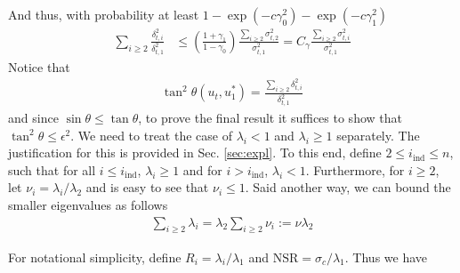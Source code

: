 \documentclass[10pt]{article}
\newcommand{\nsrmax}{\text{NSR}}
\newcommand{\ind}{\mathrm{ind}}
\begin{document}
And thus, with probability at least $ 1 - \exp(-c \gamma_0^2) - \exp(-c \gamma_1^2)$ %
\begin{align*}
\sum_{i \geq 2}\frac{\delta_{t,i}^2}{\delta_{t,1}^2} &\leq  \left(\frac{1 + \gamma_1}{1 - \gamma_0}\right) \frac{\sum_{i\geq 2} \sigma_{t,2}^2}{\sigma_{t,1}^2} = C_\gamma \frac{\sum_{i\geq 2} \sigma_{t,i}^2}{\sigma_{t,1}^2}
\end{align*}
Notice that
\begin{align*}
\tan^2\theta(u_t, u_1^*) = \frac{\sum_{i\geq 2}  \delta_{t,i}^2}{\delta_{t,1}^2}
\end{align*}
and since $\sin\theta \leq \tan \theta$, to prove the final result it suffices to show that $\tan^2\theta \leq \epsilon^2$.
%
%
%
We need to treat the case of $\lambda_i <1 $ and $\lambda_i \geq 1$ separately. The justification for this is provided in Sec. \ref{sec:expl}. To this end, define $2 \leq i_\ind \leq n$, such that for all $i \leq i_\ind$, $\lambda_i \geq 1$ and for $i > i_\ind$, $\lambda_i < 1$. Furthermore, for $i \geq 2$, let $\nu_i = \lambda_i / \lambda_2$ and is easy to see that $\nu_i \leq 1$. Said another way, we can bound the smaller eigenvalues as follows
\begin{align*}
\sum_{i \geq 2} \lambda_i = \lambda_2 \sum_{i\geq 2} \nu_i  := \nu \lambda_2
\end{align*}

For notational simplicity, define $R_i = \lambda_i/\lambda_1$ and $\nsrmax = \sigma_c/\lambda_1$. Thus we have
\end{document}

